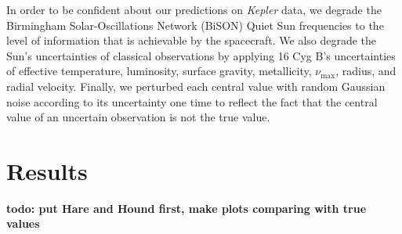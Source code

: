 \documentclass[manuscript]{aastex}
\begin{document}
In order to be confident about our predictions on \emph{Kepler} data, we degrade the Birmingham Solar-Oscillations Network (BiSON) Quiet Sun frequencies \citep{2014MNRAS.439.2025D} to the level of information that is achievable by the spacecraft. %
We also degrade the Sun's uncertainties of classical observations by applying 16 Cyg B's uncertainties of effective temperature, luminosity, surface gravity, metallicity, $\nu_{\max}$, radius, and radial velocity. Finally, we perturbed each central value with random Gaussian noise according to its uncertainty one time to reflect the fact that the central value of an uncertain observation is not the true value. 


\section{Results}
\label{sec:results} 
\textbf{todo: put Hare and Hound first, make plots comparing with true values}
\end{document}
